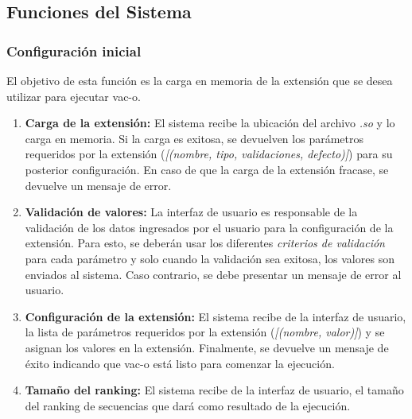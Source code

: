 \documentclass[10pt,a4paper]{article}
\begin{document}
  \subsection{Funciones del Sistema}

  \subsubsection{Configuraci\'on inicial}
  El objetivo de esta funci\'on es la carga en memoria de la extensi\'on que se
desea utilizar para ejecutar vac-o.
  \begin{enumerate}
    \item \textbf{Carga de la extensi\'on:}
    El sistema recibe la ubicaci\'on del archivo \textit{.so} y lo carga en
memoria. Si la carga es exitosa, se devuelven los par\'ametros requeridos por la
extensi\'on (\textit{[(nombre, tipo, validaciones, defecto)]}) para su posterior
configuraci\'on. En caso de que la carga de la extensi\'on fracase, se devuelve
un mensaje de error.
    
    \item \textbf{Validaci\'on de valores:}
    La interfaz de usuario es responsable de la validaci\'on de los datos
ingresados por el usuario para la configuraci\'on de la extensi\'on. Para esto,
se deber\'an usar los diferentes \textit{criterios de validaci\'on} para cada
par\'ametro y solo cuando la validaci\'on sea exitosa, los valores son enviados
al sistema. Caso contrario, se debe presentar un mensaje de error al usuario.
    
    \item \textbf{Configuraci\'on de la extensi\'on:}
    El sistema recibe de la interfaz de usuario, la lista de par\'ametros
requeridos por la extensi\'on (\textit{[(nombre, valor)]}) y se asignan los
valores en la extensi\'on. Finalmente, se devuelve un mensaje de \'exito
indicando que vac-o est\'a listo para comenzar la ejecuci\'on.

    \item \textbf{Tama\~no del ranking:}
    El sistema recibe de la interfaz de usuario, el tama\~no del ranking de
secuencias que dar\'a como resultado de la ejecuci\'on.
  \end{enumerate}
\end{document}
